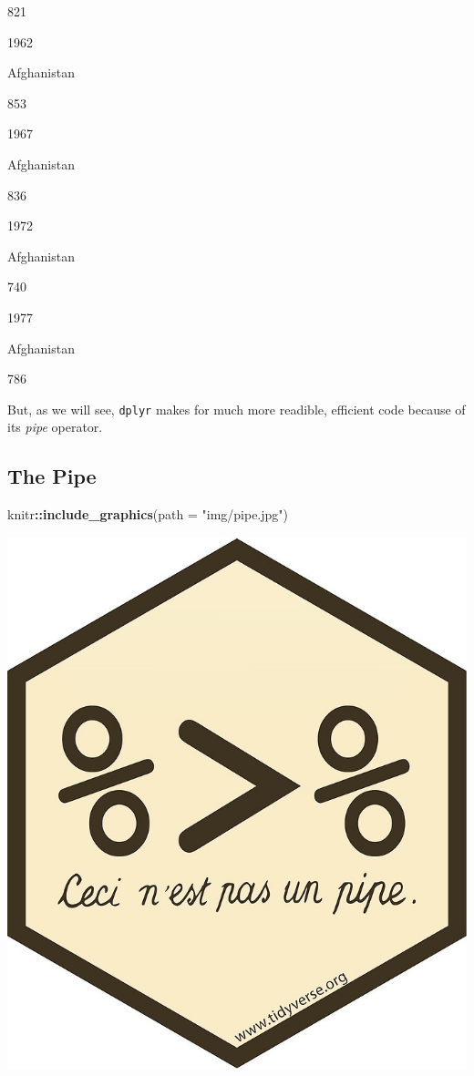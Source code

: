 \documentclass[]{book}
\newenvironment{Shaded}{\begin{snugshade}}{\end{snugshade}}
\newcommand{\KeywordTok}[1]{\textcolor[rgb]{0.13,0.29,0.53}{\textbf{#1}}}
\newcommand{\DataTypeTok}[1]{\textcolor[rgb]{0.13,0.29,0.53}{#1}}
\newcommand{\StringTok}[1]{\textcolor[rgb]{0.31,0.60,0.02}{#1}}
\newcommand{\OperatorTok}[1]{\textcolor[rgb]{0.81,0.36,0.00}{\textbf{#1}}}
\newcommand{\NormalTok}[1]{#1}
\begin{document}
821

1962

Afghanistan

853

1967

Afghanistan

836

1972

Afghanistan

740

1977

Afghanistan

786

But, as we will see, \texttt{dplyr} makes for much more readible,
efficient code because of its \emph{pipe} operator.

\subsection{The Pipe}\label{the-pipe}

\begin{Shaded}
\begin{Highlighting}[]
\NormalTok{knitr}\OperatorTok{::}\KeywordTok{include_graphics}\NormalTok{(}\DataTypeTok{path =} \StringTok{"img/pipe.jpg"}\NormalTok{)}
\end{Highlighting}
\end{Shaded}

\begin{center}\includegraphics[width=0.7\linewidth]{img/pipe} \end{center}
\end{document}
